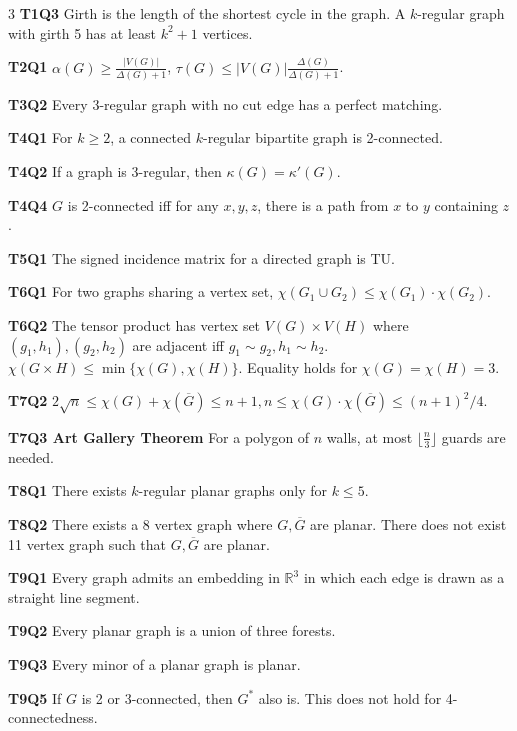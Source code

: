 \documentclass[10pt, landscape]{article}
\begin{document}
\begin{multicols*}{3}
\textbf{T1Q3} Girth is the length of the shortest cycle in the graph. A $k$-regular graph with girth 5 has at least $k^2+1$ vertices.

\textbf{T2Q1} $\alpha(G) \geq \frac{|V(G)|}{\Delta(G)+1}$, $\tau(G) \leq |V(G)|\frac{\Delta(G)}{\Delta(G)+1}$.

\textbf{T3Q2} Every $3$-regular graph with no cut edge has a perfect matching.

\textbf{T4Q1} For $k \geq 2$, a connected $k$-regular bipartite graph is 2-connected.

\textbf{T4Q2} If a graph is 3-regular, then $\kappa(G)=\kappa'(G)$.

\textbf{T4Q4} $G$ is 2-connected iff for any $x,y,z$, there is a path from $x$ to $y$ containing $z$.

\textbf{T5Q1} The signed incidence matrix for a directed graph is TU.

\textbf{T6Q1} For two graphs sharing a vertex set, $\chi(G_1 \cup G_2) \leq \chi(G_1) \cdot \chi(G_2)$.

\textbf{T6Q2} The tensor product has vertex set $V(G) \times V(H)$ where $(g_1,h_1), (g_2,h_2)$ are adjacent iff $g_1 \sim g_2, h_1 \sim h_2$. $\chi(G \times H) \leq \min\{\chi(G), \chi(H)\}$. Equality holds for $\chi(G)=\chi(H)=3$.

\textbf{T7Q2} $2\sqrt{n} \leq \chi(G) + \chi(\overline{G})\leq n+1, n \leq \chi(G) \cdot \chi(\overline{G}) \leq (n+1)^2/4$.

\textbf{T7Q3 Art Gallery Theorem} For a polygon of $n$ walls, at most $\lfloor \frac{n}{3} \rfloor$ guards are needed.

\textbf{T8Q1} There exists $k$-regular planar graphs only for $k \leq 5$.

\textbf{T8Q2} There exists a 8 vertex graph where $G, \overline{G}$ are planar. There does not exist 11 vertex graph such that $G, \overline{G}$ are planar.

\textbf{T9Q1} Every graph admits an embedding in $\mathbb{R}^3$ in which each edge is drawn as a straight line segment.

\textbf{T9Q2} Every planar graph is a union of three forests.

\textbf{T9Q3} Every minor of a planar graph is planar.

\textbf{T9Q5} If $G$ is 2 or 3-connected, then $G^*$ also is. This does not hold for 4-connectedness.

\end{multicols*}
\end{document}
